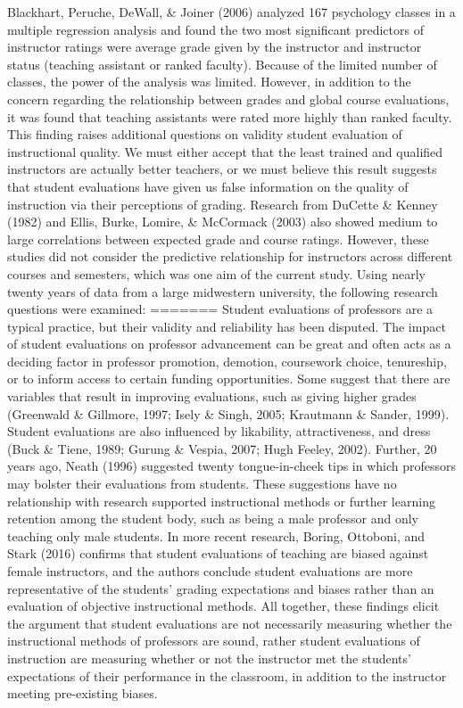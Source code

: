 \documentclass[man]{apa6}
\newcounter{author}
\theoremstyle{definition}
\theoremstyle{definition}
\theoremstyle{definition}
\theoremstyle{remark}
\begin{document}
Blackhart, Peruche, DeWall, \& Joiner (2006) analyzed 167 psychology
classes in a multiple regression analysis and found the two most
significant predictors of instructor ratings were average grade given by
the instructor and instructor status (teaching assistant or ranked
faculty). Because of the limited number of classes, the power of the
analysis was limited. However, in addition to the concern regarding the
relationship between grades and global course evaluations, it was found
that teaching assistants were rated more highly than ranked faculty.
This finding raises additional questions on validity student evaluation
of instructional quality. We must either accept that the least trained
and qualified instructors are actually better teachers, or we must
believe this result suggests that student evaluations have given us
false information on the quality of instruction via their perceptions of
grading. Research from DuCette \& Kenney (1982) and Ellis, Burke,
Lomire, \& McCormack (2003) also showed medium to large correlations
between expected grade and course ratings. However, these studies did
not consider the predictive relationship for instructors across
different courses and semesters, which was one aim of the current study.
Using nearly twenty years of data from a large midwestern university,
the following research questions were examined:
=======
Student evaluations of professors are a typical practice, but their validity and reliability has been disputed. The impact of student evaluations on professor advancement can be great and often acts as a deciding factor in professor promotion, demotion, coursework choice, tenureship, or to inform access to certain funding opportunities. Some suggest that there are variables that result in improving evaluations, such as giving higher grades (Greenwald \& Gillmore, 1997; Isely \& Singh, 2005; Krautmann \& Sander, 1999). Student evaluations are also influenced by likability, attractiveness, and dress (Buck \& Tiene, 1989; Gurung \& Vespia, 2007; Hugh Feeley, 2002). Further, 20 years ago, Neath (1996) suggested twenty tongue-in-cheek tips in which professors may bolster their evaluations from students. These suggestions have no relationship with research supported instructional methods or further learning retention among the student body, such as being a male professor and only teaching only male students. In more recent research, Boring, Ottoboni, and Stark (2016) confirms that student evaluations of teaching are biased against female instructors, and the authors conclude student evaluations are more representative of the students' grading expectations and biases rather than an evaluation of objective instructional methods. All together, these findings elicit the argument that student evaluations are not necessarily measuring whether the instructional methods of professors are sound, rather student evaluations of instruction are measuring whether or not the instructor met the students' expectations of their performance in the classroom, in addition to the instructor meeting pre-existing biases.
\end{document}
